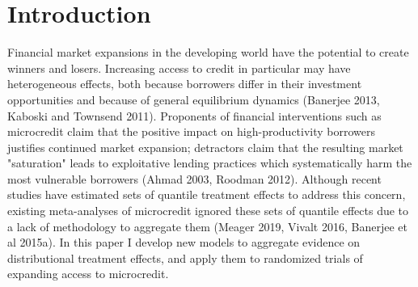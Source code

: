 \documentclass[english,12pt]{article}\usepackage{lmodern}
\numberwithin{equation}{section}
\begin{document}
\newpage



\section{Introduction}


Financial market expansions in the developing world have the potential to create winners and losers. Increasing access to credit in particular may have heterogeneous effects, both because borrowers differ in their investment opportunities and because of general equilibrium dynamics (Banerjee 2013, Kaboski and Townsend 2011). Proponents of financial interventions such as microcredit claim that the positive impact on high-productivity borrowers justifies continued market expansion; detractors claim that the resulting market "saturation" leads to exploitative lending practices which systematically harm the most vulnerable borrowers (Ahmad 2003, Roodman 2012). Although recent studies have estimated sets of quantile treatment effects to address this concern, existing meta-analyses of microcredit ignored these sets of quantile effects due to a lack of methodology to aggregate them (Meager 2019, Vivalt 2016, Banerjee et al 2015a). In this paper I develop new models to aggregate evidence on distributional treatment effects, and apply them to randomized trials of expanding access to microcredit.
\end{document}
